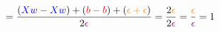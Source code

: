 \documentclass{article}
\begin{document}
\begin{displaymath}
=\frac{(\textcolor{blue}{Xw-Xw})+(\textcolor{red}{b-b})+(
\textcolor{orange}{\epsilon+\epsilon})}{2\textcolor{violet}{\epsilon}}
=\frac{2\textcolor{orange}{\epsilon}}
{2\textcolor{violet}{\epsilon}}
=\frac{\textcolor{orange}{\epsilon}}
{\textcolor{violet}{\epsilon}}
= 1
\end{displaymath}
\end{document}
